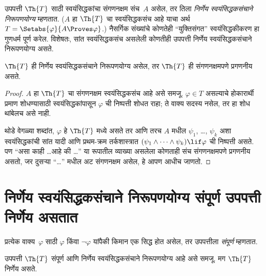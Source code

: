 उपपत्ती $\Th{T}$ साठी स्वयंसिद्धकांचा संगणनक्षम संच~$A$ असेल,
तर तिला \emph{निर्णेय स्वयंसिद्धकसंचाने निरूपणयोग्य} म्हणतात.
($A$ हा $\Th{T}$ चा स्वयंसिद्धकसंच आहे याचा अर्थ
$T = \Setabs{\varphi}{A \Proves \varphi}$.) नैसर्गिक संख्यांचे कोणतेही
``युक्तिसंगत'' स्वयंसिद्धकीकरण हा गुणधर्म पूर्ण करेल.
विशेषतः, सांत स्वयंसिद्धकसंच असलेली कोणतीही उपपत्ती
निर्णेय स्वयंसिद्धकसंचाने निरूपणयोग्य असते.

\begin{lem}
$\Th{T}$ ही निर्णेय स्वयंसिद्धकसंचाने निरूपणयोग्य असेल, तर $\Th{T}$ ही
संगणनक्षमपणे प्रगणनीय असते.
\end{lem}

\begin{proof}
$A$ हा $\Th{T}$ चा संगणनक्षम स्वयंसिद्धकसंच आहे असे समजू.
$\varphi \in T$ असल्याचे होकारार्थी प्रमाण शोधण्यासाठी
स्वयंसिद्धकांपासून $\varphi$ ची निष्पत्ती शोधत राहा;
ते वाक्य सदस्य नसेल, तर हा शोध थांबेलच असे नाही.

थोडे वेगळ्या शब्दांत, $\varphi$ हे $\Th{T}$ मध्ये असते तर आणि तरच $A$ मधील $\psi_1$, \dots, $\psi_k$ अशा स्वयंसिद्धकांची
सांत यादी आणि प्रथम-क्रम तर्कशास्त्रात
$(\psi_1 \land \dots \land \psi_k) \lif \varphi$ ची
निष्पत्ती असते. पण ``असा काही \dots आहे की \dots''
या रूपातील व्याख्या असलेला कोणताही संच संगणनक्षमपणे प्रगणनीय असतो,
जर दुसऱ्या ``\dots'' मधील अट संगणनक्षम असेल, हे आपण आधीच जाणतो.
\end{proof}












\section{निर्णेय स्वयंसिद्धकसंचाने निरूपणयोग्य संपूर्ण उपपत्ती निर्णेय असतात}\label{inc:tcp:cdc:sec}

प्रत्येक वाक्य~$\varphi$ साठी $\varphi$ किंवा $\lnot \varphi$ यांपैकी
किमान एक सिद्ध होत असेल, तर उपपत्तीला {\em संपूर्ण} म्हणतात.

\begin{lem}
उपपत्ती $\Th{T}$ संपूर्ण आणि निर्णेय स्वयंसिद्धकसंचाने निरूपणयोग्य आहे असे समजू.
मग $\Th{T}$ निर्णेय असते.
\end{lem}

